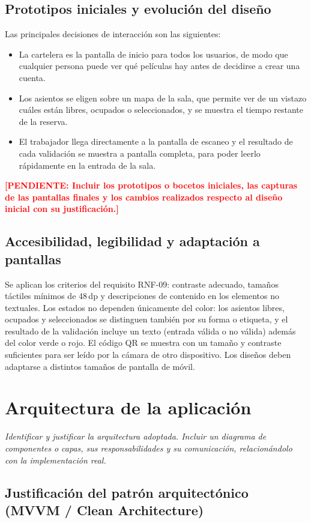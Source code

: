 \documentclass[11pt,a4paper]{article}
\newcommand{\pendiente}[1]{\textcolor{red}{\textbf{[PENDIENTE: #1]}}}
\begin{document}
\subsection{Prototipos iniciales y evolución del diseño}
Las principales decisiones de interacción son las siguientes:
\begin{itemize}
    \item La cartelera es la pantalla de inicio para todos los usuarios, de modo que cualquier persona puede ver qué películas hay antes de decidirse a crear una cuenta.
    \item Los asientos se eligen sobre un mapa de la sala, que permite ver de un vistazo cuáles están libres, ocupados o seleccionados, y se muestra el tiempo restante de la reserva.
    \item El trabajador llega directamente a la pantalla de escaneo y el resultado de cada validación se muestra a pantalla completa, para poder leerlo rápidamente en la entrada de la sala.
\end{itemize}
\pendiente{Incluir los prototipos o bocetos iniciales, las capturas de las pantallas finales y los cambios realizados respecto al diseño inicial con su justificación.}

\subsection{Accesibilidad, legibilidad y adaptación a pantallas}
Se aplican los criterios del requisito RNF-09: contraste adecuado, tamaños táctiles mínimos de 48\,dp y descripciones de contenido en los elementos no textuales. Los estados no dependen únicamente del color: los asientos libres, ocupados y seleccionados se distinguen también por su forma o etiqueta, y el resultado de la validación incluye un texto (entrada válida o no válida) además del color verde o rojo. El código QR se muestra con un tamaño y contraste suficientes para ser leído por la cámara de otro dispositivo. Los diseños deben adaptarse a distintos tamaños de pantalla de móvil.

\section{Arquitectura de la aplicación}
\textit{Identificar y justificar la arquitectura adoptada. Incluir un diagrama de componentes o capas, sus responsabilidades y su comunicación, relacionándolo con la implementación real.}

\subsection{Justificación del patrón arquitectónico (MVVM / Clean Architecture)}
\end{document}
